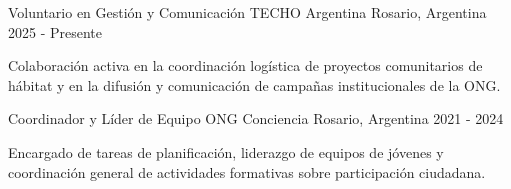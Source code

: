 \documentclass[11pt, a4paper]{awesome-cv}
\begin{document}
\begin{cventries}

  \cventry
    {Voluntario en Gestión y Comunicación} %
    {TECHO Argentina} %
    {Rosario, Argentina} %
    {2025 - Presente} %
    {
      \begin{cvitems}
        \item {Colaboración activa en la coordinación logística de proyectos comunitarios de hábitat y en la difusión y comunicación de campañas institucionales de la ONG.}
      \end{cvitems}
    }

  \cventry
    {Coordinador y Líder de Equipo} %
    {ONG Conciencia} %
    {Rosario, Argentina} %
    {2021 - 2024} %
    {
      \begin{cvitems}
        \item {Encargado de tareas de planificación, liderazgo de equipos de jóvenes y coordinación general de actividades formativas sobre participación ciudadana.}
      \end{cvitems}
    }

\end{cventries}



\begin{cvskills}
\end{cvskills}
\end{document}
